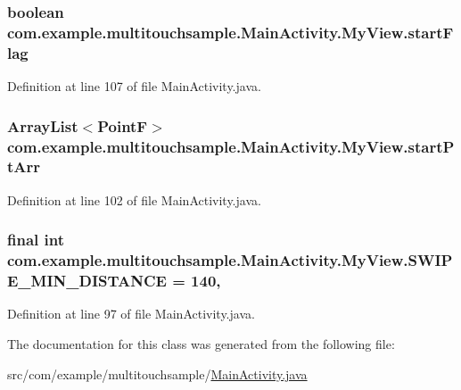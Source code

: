\subsubsection[{start\+Flag}]{\setlength{\rightskip}{0pt plus 5cm}boolean com.\+example.\+multitouchsample.\+Main\+Activity.\+My\+View.\+start\+Flag\hspace{0.3cm}{\ttfamily [private]}}\label{classcom_1_1example_1_1multitouchsample_1_1_main_activity_1_1_my_view_a10816f1798f68acf937c930b526b112d}


Definition at line 107 of file Main\+Activity.\+java.

\hypertarget{classcom_1_1example_1_1multitouchsample_1_1_main_activity_1_1_my_view_a8e580a64440ed09158aa2bbc50ad4cf6}{}
\subsubsection[{start\+Pt\+Arr}]{\setlength{\rightskip}{0pt plus 5cm}Array\+List$<$Point\+F$>$ com.\+example.\+multitouchsample.\+Main\+Activity.\+My\+View.\+start\+Pt\+Arr\hspace{0.3cm}{\ttfamily [private]}}\label{classcom_1_1example_1_1multitouchsample_1_1_main_activity_1_1_my_view_a8e580a64440ed09158aa2bbc50ad4cf6}


Definition at line 102 of file Main\+Activity.\+java.

\hypertarget{classcom_1_1example_1_1multitouchsample_1_1_main_activity_1_1_my_view_a677194aa1ca850fc0e716d725f691ba1}{}
\subsubsection[{S\+W\+I\+P\+E\+\_\+\+M\+I\+N\+\_\+\+D\+I\+S\+T\+A\+N\+C\+E}]{\setlength{\rightskip}{0pt plus 5cm}final int com.\+example.\+multitouchsample.\+Main\+Activity.\+My\+View.\+S\+W\+I\+P\+E\+\_\+\+M\+I\+N\+\_\+\+D\+I\+S\+T\+A\+N\+C\+E = 140\hspace{0.3cm}{\ttfamily [static]}, {\ttfamily [private]}}\label{classcom_1_1example_1_1multitouchsample_1_1_main_activity_1_1_my_view_a677194aa1ca850fc0e716d725f691ba1}


Definition at line 97 of file Main\+Activity.\+java.



The documentation for this class was generated from the following file\+:\begin{DoxyCompactItemize}
\item 
src/com/example/multitouchsample/\hyperlink{_main_activity_8java}{Main\+Activity.\+java}\end{DoxyCompactItemize}
